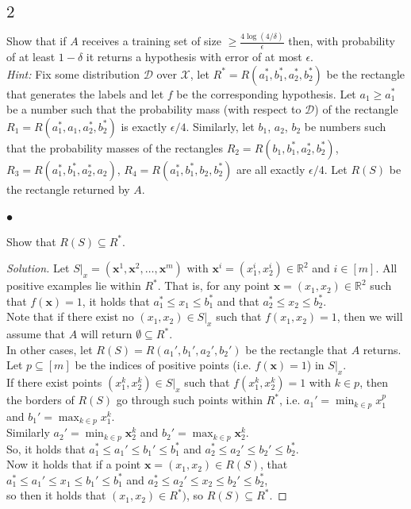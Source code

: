 \documentclass[10pt, a4paper, twoside]{amsart}
\newcommand{\R}{\ensuremath{\mathbb{R}}}
\newcommand{\se}{\ensuremath{\subseteq}}
\newenvironment{solution}
               {\let\oldqedsymbol=\qedsymbol
                \renewcommand{\qedsymbol}{$\blacktriangleleft$}
                \begin{proof}[Solution]}
               {\end{proof}
                \renewcommand{\qedsymbol}{\oldqedsymbol}}
\newcommand{\TODO}{\textcolor{red}{\textbf{!!!!!! }}}
\begin{document}
\subsection*{$2$}

Show that if $A$ receives a training set of size $\geq \frac{4 \log (4/\delta)}{\epsilon}$ then, with probability of at least $1-\delta$ it returns a hypothesis with error  of at most $\epsilon$.\\
\textit{Hint:} Fix some distribution $\mathcal{D}$ over $\mathcal{X}$, let $R^* = R(a_1^*,b_1^*,a_2^*,b_2^*)$ be the rectangle that generates the labels and let $f$ be the corresponding hypothesis. Let $a_1 \geq a_1^*$ be a number such that the probability mass (with respect to $\mathcal{D}$) of the rectangle $R_1 = R(a_1^*,a_1,a_2^*,b_2^*)$ is exactly $\epsilon/4$. Similarly, let $b_1$, $a_2$, $b_2$ be numbers such that the probability masses of the rectangles $R_2 = R(b_1,b_1^*,a_2^*,b_2^*)$, $R_3 =  R(a_1^*,b_1^*,a_2^*,a_2)$, $R_4 =  R(a_1^*,b_1^*,b_2,b_2^*)$ are all exactly $\epsilon/4$. Let $R(S)$ be the rectangle returned by $A$.

\subsubsection*{$\bullet$} 
Show that $R(S)\subseteq R^*$.

\begin{solution}
Let $S|_x = (\mathbf{x}^1, \mathbf{x}^2,\ldots, \mathbf{x}^m)$ with $\mathbf{x}^i = (x_1^i,x_2^i) \in \R^2$ and $i \in [m]$.
All positive examples lie within $R^*$. That is, for any point $\mathbf{x} = (x_1,x_2) \in \R^2$ such that $f(\mathbf{x})=1$, it holds that $a_1^*\leq x_1 \leq b_1^*$ and that $a_2^*\leq x_2 \leq b_2^*$.\\
Note that if there exist no $(x_1,x_2) \in S|_x$ such that $f(x_1,x_2)=1$, then we will assume that $A$ will return $\emptyset \subseteq R^*$.\\
In other cases, let $R(S) = R(a_1',b_1',a_2',b_2')$ be the rectangle that $A$ returns.\\
Let $p \subseteq [m]$ be the indices of positive points (i.e. $f(\mathbf{x})=1$) in $S|_x$.\\
If there exist points $(x^k_1,x^k_2)\in S|_x$ such that $f(x^k_1,x^k_2)=1$ with $k \in p$, then the borders of $R(S)$ go through such points within $R^*$, i.e. $a_1' = \min_{k\in p} x^p_1$ and $b_1' = \max_{k\in p} x^k_1$.\\
Similarly $a_2' = \min_{k\in p} \mathbf{x}^k_2$ and $b_2' = \max_{k\in p} \mathbf{x}^k_2$.\\
So, it holds that $a_1^*\leq a_1'\leq b_1' \leq b_1^*$ and $a_2^* \leq a_2' \leq b_2' \leq b_2^*$.\\ Now it holds that if a point $\mathbf{x} = (x_1, x_2)\in R(S)$, that $a_1^*\leq a_1'\leq x_1 \leq b_1' \leq b_1^*$ and $a_2^* \leq a_2'\leq x_2 \leq b_2' \leq b_2^*$,\\
so then it holds that $(x_1,x_2) \in R^*)$, so $R(S) \subseteq R^*$.
\end{solution}
\end{document}
